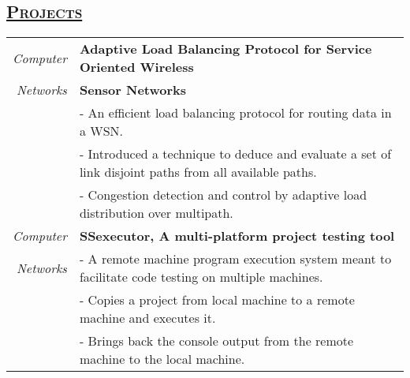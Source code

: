 \documentclass[14pt]{article}
\begin{document}
\subsection* {\scshape\large\uline {Projects}}
\begin{tabularx}{\textwidth}{r X}
\emph{Computer} & \textbf{Adaptive Load Balancing Protocol for Service Oriented Wireless} \\
\emph{Networks} & \textbf{Sensor Networks} \\
                             & - An efficient load balancing protocol for routing data in a WSN.\\
                             & - Introduced a technique to deduce and evaluate a set of link disjoint paths from all available paths.\\
                             & - Congestion detection and control by adaptive load distribution over multipath.
\\
\emph{Computer} & \textbf{SSexecutor, A multi-platform project testing tool} \\
\emph{Networks} & - A remote machine program execution system meant to facilitate code testing on multiple machines.\\
                & - Copies a project from local machine to a remote machine and executes it.\\
                & - Brings back the console output from the remote machine to the local machine.\\
\end{tabularx}
\end{document}
